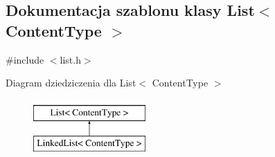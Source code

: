\hypertarget{class_list}{\subsection{Dokumentacja szablonu klasy List$<$ Content\-Type $>$}
\label{class_list}
}


{\ttfamily \#include $<$list.\-h$>$}

Diagram dziedziczenia dla List$<$ Content\-Type $>$\begin{figure}[H]
\begin{center}
\leavevmode
\includegraphics[height=2.000000cm]{class_list}
\end{center}
\end{figure}
